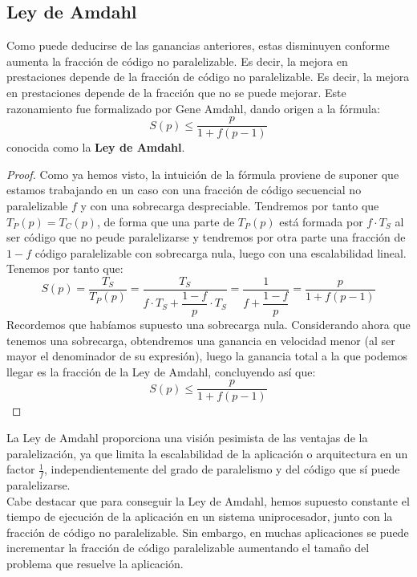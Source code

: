 \subsection{Ley de Amdahl}
Como puede deducirse de las ganancias anteriores, estas disminuyen conforme aumenta la fracción de código no paralelizable. Es decir, la mejora en prestaciones depende de la fracción de código no paralelizable. Es decir, la mejora en prestaciones depende de la fracción que no se puede mejorar. Este razonamiento fue formalizado por Gene Amdahl, dando origen a la fórmula:
\begin{equation}
    S(p) \leq \dfrac{p}{1+f(p-1)}
\end{equation}
conocida como la \textbf{Ley de Amdahl}. 
\begin{proof}
    Como ya hemos visto, la intuición de la fórmula proviene de suponer que estamos trabajando en un caso con una fracción de código secuencial no paralelizable $f$ y con una sobrecarga despreciable. Tendremos por tanto que $T_P(p) = T_C(p)$, de forma que una parte de $T_P(p)$ está formada por $f\cdot T_S$ al ser código que no peude paralelizarse y tendremos por otra parte una fracción de $1-f$ código paralelizable con sobrecarga nula, luego con una escalabilidad lineal. Tenemos por tanto que:
    \begin{equation*}
        S(p) = \dfrac{T_S}{T_P(p)} = \dfrac{T_S}{f\cdot T_S+\dfrac{1-f}{p}\cdot T_S} = \dfrac{1}{f+\dfrac{1-f}{p}} = \dfrac{p}{1+f(p-1)}
    \end{equation*}
    Recordemos que habíamos supuesto una sobrecarga nula. Considerando ahora que tenemos una sobrecarga, obtendremos una ganancia en velocidad menor (al ser mayor el denominador de su expresión), luego la ganancia total a la que podemos llegar es la fracción de la Ley de Amdahl, concluyendo así que:
    \begin{equation*}
        S(p) \leq \dfrac{p}{1+f(p-1)}
    \end{equation*}
\end{proof}

La Ley de Amdahl proporciona una visión pesimista de las ventajas de la paralelización, ya que limita la escalabilidad de la aplicación o arquitectura en un factor $\frac{1}{f}$, independientemente del grado de paralelismo y del código que sí puede paralelizarse.\\

Cabe destacar que para conseguir la Ley de Amdahl, hemos supuesto constante el tiempo de ejecución de la aplicación en un sistema uniprocesador, junto con la fracción de código no paralelizable. Sin embargo, en muchas aplicaciones se puede incrementar la fracción de código paralelizable aumentando el tamaño del problema que resuelve la aplicación.


